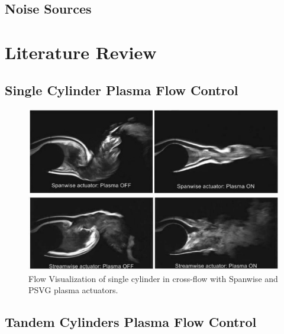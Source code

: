 \subsection{Noise Sources}

\section{Literature Review}

\subsection{Single Cylinder Plasma Flow Control}

\begin{figure}
	\begin{center}
		\centerline{\includegraphics[scale=1.0]{figures/single_span.pdf}}
		\centerline{\includegraphics[scale=1.0]{figures/single_psvg.pdf}}
		\caption{Flow Visualization of single cylinder in cross-flow with Spanwise and PSVG plasma actuators.}
		\label{fig:cyl1}
	\end{center}
\end{figure}


\subsection{Tandem Cylinders Plasma Flow Control}

